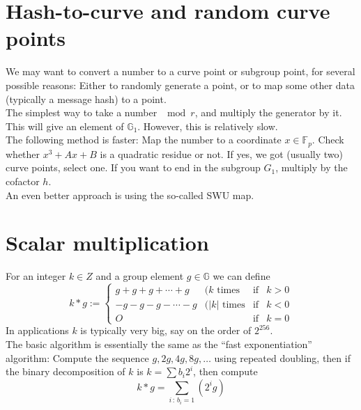 \documentclass[12pt,draft,a4paper,openany,oneside]{amsbook}
\def\F{\mathbb{F}}
\def\G{\mathbb{G}}
\theoremstyle{plain}
\theoremstyle{definition}
\begin{document}

\section{Hash-to-curve and random curve points}

We may want to convert a number to a curve point or subgroup point, for several 
possible reasons: Either to randomly generate a point, or to map some other
data (typically a message hash) to a point.\\

The simplest way to take a number $\mod r$, and multiply the generator by it.
This will give an element of $\G_1$. However, this is relatively slow.\\

The following method is faster: Map the number to a coordinate $x\in\F_p$. Check
whether $x^3+Ax+B$ is a quadratic residue or not. If yes, we got (usually two)
curve points, select one. If you want to end in the subgroup $G_1$, multiply by
the cofactor $h$.\\

An even better approach is using the so-called SWU map.


\section{Scalar multiplication}

For an integer $k\in Z$ and a group element $g\in\G$ we can define
\[ k*g := \left\{\begin{array}{llll}
g+g+g+\cdots +g  &(k   \textrm{ times}&\textrm{if}& k > 0 \\
-g-g-g-\cdots -g &(|k| \textrm{ times}&\textrm{if}& k < 0 \\
O                &                    &\textrm{if}& k = 0
\end{array}
\right.
\]
In applications $k$ is typically very big, say on the order of $2^{256}$.\\

The basic algorithm is essentially the same as the ``fast exponentiation''
algorithm: Compute the sequence $g,2g,4g,8g,\dots$ using repeated doubling,
then if the binary decomposition of $k$ is $k=\sum b_i2^i$, then compute
\[ k*g = \sum_{i\,:\,b_i=1} (2^i g) \]
\end{document}
